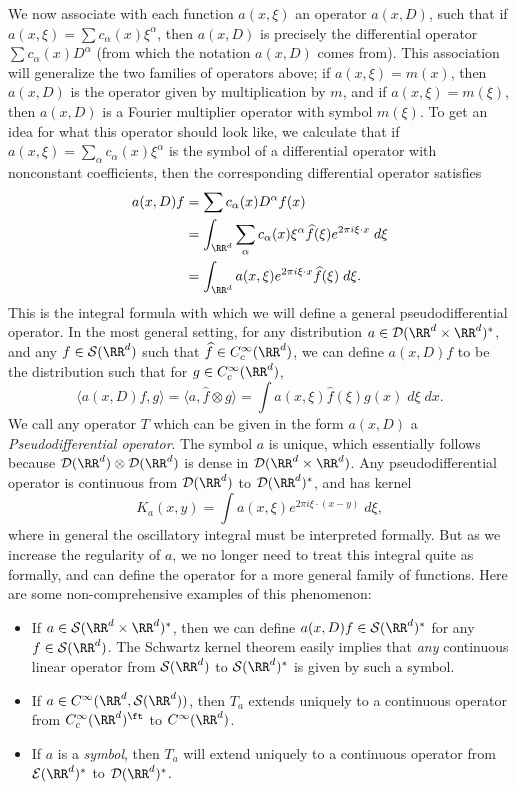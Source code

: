 We now associate with each function $a(x,\xi)$ an operator $a(x,D)$, such that if $a(x,\xi) = \sum c_\alpha(x) \xi^\alpha$, then $a(x,D)$ is precisely the differential operator $\sum c_\alpha(x) D^\alpha$ (from which the notation $a(x,D)$ comes from). This association will generalize the two families of operators above; if $a(x,\xi) = m(x)$, then $a(x,D)$ is the operator given by multiplication by $m$, and if $a(x,\xi) = m(\xi)$, then $a(x,D)$ is a Fourier multiplier operator with symbol $m(\xi)$. To get an idea for what this operator should look like, we calculate that if $a(x,\xi) = \sum_\alpha c_\alpha(x) \xi^\alpha$ is the symbol of a differential operator with nonconstant coefficients, then the corresponding differential operator satisfies
%
\begin{align*}
    a(x,D) f &= \sum c_\alpha(x) D^\alpha f(x)\\
    &= \int_{\RR^d} \sum_\alpha c_\alpha(x) \xi^\alpha \widehat{f}(\xi) e^{2 \pi i \xi \cdot x}\; d\xi\\
    &= \int_{\RR^d} a(x,\xi) e^{2 \pi i \xi \cdot x} \widehat{f}(\xi)\; d\xi.
\end{align*}
%
This is the integral formula with which we will define a general pseudodifferential operator. In the most general setting, for any distribution $a \in \mathcal{D}(\RR^d \times \RR^d)^*$, and any $f \in \mathcal{S}(\RR^d)$ such that $\widehat{f} \in C_c^\infty(\RR^d)$, we can define $a(x,D) f$ to be the distribution such that for $g \in C_c^\infty(\RR^d)$,
%
\[ \langle a(x,D) f, g \rangle = \langle a, \widehat{f} \otimes g \rangle = \int a(x,\xi) \widehat{f}(\xi) g(x)\; d\xi\; dx. \]
%
We call any operator $T$ which can be given in the form $a(x,D)$ a \emph{Pseudodifferential operator}. The symbol $a$ is unique, which essentially follows because $\mathcal{D}(\RR^d) \otimes \mathcal{D}(\RR^d)$ is dense in $\mathcal{D}(\RR^d \times \RR^d)$. Any pseudodifferential operator is continuous from $\mathcal{D}(\RR^d)$ to $\mathcal{D}(\RR^d)^*$, and has kernel
%
\[ K_a(x,y) = \int a(x,\xi) e^{2 \pi i \xi \cdot (x - y)}\; d\xi, \]
%
where in general the oscillatory integral must be interpreted formally. But as we increase the regularity of $a$, we no longer need to treat this integral quite as formally, and can define the operator for a more general family of functions. Here are some non-comprehensive examples of this phenomenon:
%
\begin{itemize}
    \item If $a \in \mathcal{S}(\RR^d \times \RR^d)^*$, then we can define $a(x,D) f \in \mathcal{S}(\RR^d)^*$ for any $f \in \mathcal{S}(\RR^d)$. The Schwartz kernel theorem easily implies that \emph{any} continuous linear operator from $\mathcal{S}(\RR^d)$ to $\mathcal{S}(\RR^d)^*$ is given by such a symbol.

    \item If $a \in C^\infty(\RR^d, \mathcal{S}(\RR^d))$, then $T_a$ extends uniquely to a continuous operator from $C_c^\infty(\RR^d)^\ft$ to $C^\infty(\RR^d)$.

    \item If $a$ is a \emph{symbol}, then $T_a$ will extend uniquely to a continuous operator from $\mathcal{E}(\RR^d)^*$ to $\mathcal{D}(\RR^d)^*$.
\end{itemize}
